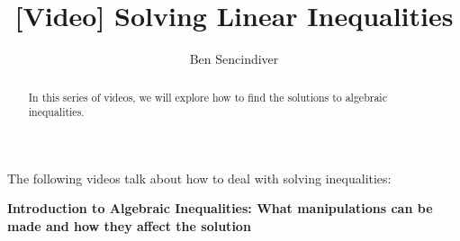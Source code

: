 \documentclass{ximera}
\title[Prerequisite Videos: ]{[Video] Solving Linear Inequalities}
\author{Ben Sencindiver}
\begin{document}
\begin{abstract}
  In this series of videos, we will explore how to find the solutions
  to algebraic inequalities. 
\end{abstract}
\maketitle

The following videos talk about how to deal with solving inequalities:


\textbf{Introduction to Algebraic Inequalities: What manipulations
can be made and how they affect the solution}

\begin{center}
\end{center}
\end{document}
